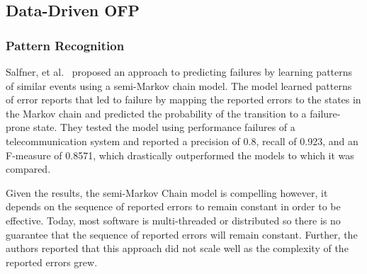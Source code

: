 \subsection{Data-Driven \ac{OFP}}

\subsubsection{Pattern Recognition}
Salfner, et al.~\cite{salfner2006} proposed an approach to predicting failures
by learning patterns of similar events using a semi-Markov chain model.
The model learned patterns of error reports that led to failure by mapping the
reported errors to the states in the Markov chain and predicted the probability
of the transition to a failure-prone state.  They tested the model using
performance failures of a telecommunication system and reported a precision of
0.8, recall of 0.923, and an F-measure of 0.8571, which drastically
outperformed the models to which it was compared.

Given the results, the semi-Markov Chain model is compelling however, it
depends on the sequence of reported errors to remain constant in order to be
effective.  Today, most software is multi-threaded or distributed so there is
no guarantee that the sequence of reported errors will remain constant.
Further, the authors reported that this approach did not scale well as the
complexity of the reported errors grew.

